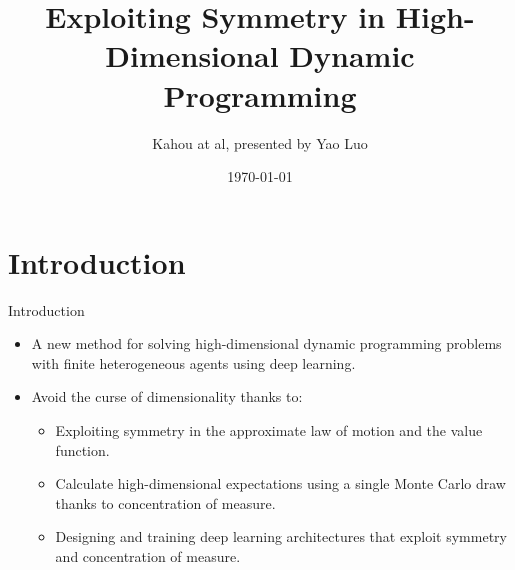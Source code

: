 \documentclass[dvipsnames,mathserif]{beamer}
\begin{document}
\rightskip\rightmargin
\title{Exploiting Symmetry in High-Dimensional Dynamic Programming}
\author{Kahou at al, presented by Yao Luo}

\footnotesize{\date{\today }


\begin{frame}
\maketitle
\end{frame}


%
\footnotesize \tableofcontents
%
\section{Introduction}
\begin{frame}{Introduction}
    \begin{itemize}
        \item A new method for solving high-dimensional dynamic programming problems with finite heterogeneous agents using deep learning.\\
        \vspace{0.2cm}
        \item Avoid the curse of dimensionality thanks to:
        \begin{itemize}
            \item Exploiting symmetry in the approximate law of motion and the value function.
            \vspace{0.1cm}
            \item Calculate high-dimensional expectations using a single Monte Carlo draw thanks to concentration of measure.
            \vspace{0.1cm}
            \item Designing and training deep learning architectures that exploit symmetry and concentration of measure.
        \end{itemize}
    \end{itemize}
\end{frame}


}
\end{document}
